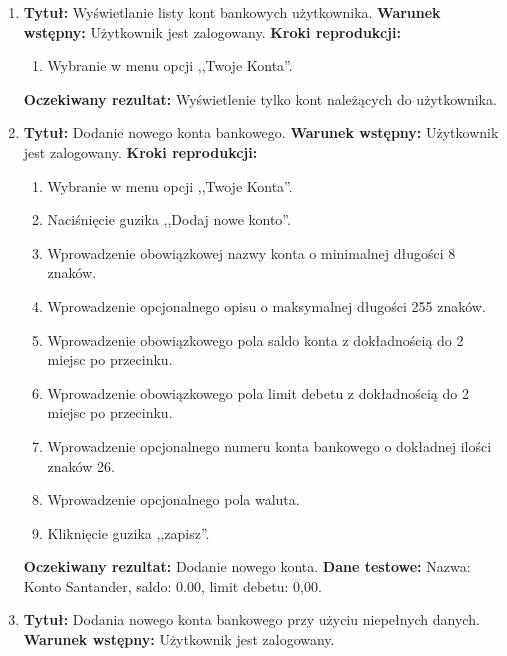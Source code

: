 \begin{enumerate}[labelwidth=1em,label=\Roman*]
\item 
    \textbf{Tytuł:} Wyświetlanie listy kont bankowych użytkownika. \newline
    \textbf{Warunek wstępny:} Użytkownik jest zalogowany. \newline
    \textbf{Kroki reprodukcji:}  \begin{enumerate}[label=\arabic*.]
        \item Wybranie w menu opcji ,,Twoje Konta''.
    \end{enumerate}
    \textbf{Oczekiwany rezultat:}  Wyświetlenie tylko kont należących do użytkownika. \newline
\item 
    \textbf{Tytuł:} Dodanie nowego konta bankowego. \newline
    \textbf{Warunek wstępny:} Użytkownik jest zalogowany. \newline
    \textbf{Kroki reprodukcji:}  \begin{enumerate}[label=\arabic*.]
        \item Wybranie w menu opcji ,,Twoje Konta''.
        \item Naciśnięcie guzika ,,Dodaj nowe konto''.
        \item Wprowadzenie obowiązkowej nazwy konta o minimalnej długości 8 znaków.
        \item Wprowadzenie opcjonalnego opisu o maksymalnej długości 255 znaków.
        \item Wprowadzenie obowiązkowego pola saldo konta z dokładnością do 2 miejsc po przecinku.
        \item Wprowadzenie obowiązkowego pola limit debetu z dokładnością do 2 miejsc po przecinku.
        \item Wprowadzenie opcjonalnego numeru konta bankowego o dokładnej ilości znaków 26.
        \item Wprowadzenie opcjonalnego pola waluta.
        \item Kliknięcie guzika ,,zapisz''.
    \end{enumerate}
    \textbf{Oczekiwany rezultat:}  Dodanie nowego konta. \newline
    \textbf{Dane testowe:} Nazwa: Konto Santander, saldo:  0.00, limit debetu: 0,00.
\item
    \textbf{Tytuł:} Dodania nowego konta bankowego przy użyciu niepełnych danych. \newline
    \textbf{Warunek wstępny:} Użytkownik jest zalogowany. \newline

\end{enumerate}
